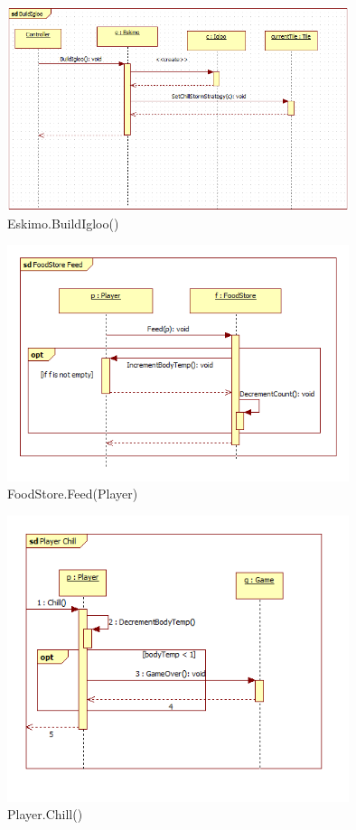 \begin{figure}[H]
	\begin{center}
		\includegraphics[width=10cm]{chapters/chapter03/seqdiag/Eskimo_BuildIgloo.png}
		\caption{Eskimo.BuildIgloo()}
		\label{fig:EskimoBuildIgloo}
	\end{center}
\end{figure}
\begin{figure}[H]
	\begin{center}
		\includegraphics[width=10cm]{chapters/chapter03/seqdiag/FoodStore_Feed.png}
		\caption{FoodStore.Feed(Player)}
		\label{fig:FoodStoreFeed}
	\end{center}
\end{figure}
\begin{figure}[H]
	\begin{center}
		\includegraphics[width=10cm]{chapters/chapter03/seqdiag/Player_Chill.png}
		\caption{Player.Chill()}
		\label{fig:PlayerChill}
	\end{center}
\end{figure}
